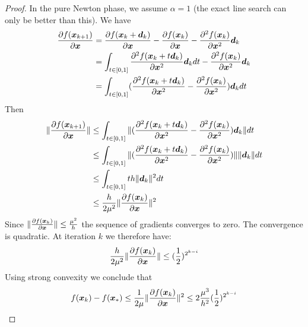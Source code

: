 \begin{proof}
   In the pure Newton phase, we assume $\alpha=1$ (the exact line search can
   only be better than this).
   We have
   \begin{align}
     \partialfrac{\xb}{f(\xb_{k+1})} &= \partialfrac{\xb}{f(\xb_{k} + \db_k)} -\partialfrac{\xb}{f(\xb_k)} -  \partialfrac{\xb^2}{^2 f(\xb_k)} \db_k \\
                                     &= \int_{t \in [0, 1]} \partialfrac{\xb^2}{^2 f(\xb_{k} + t \db_k)} \db_k dt  -  \partialfrac{\xb^2}{^2 f(\xb_k)} \db_k \\
                                     &=\int_{t \in [0, 1]} (\partialfrac{\xb^2}{^2 f(\xb_{k} + t \db_k)} -  \partialfrac{\xb^2}{^2 f(\xb_k)}) \db_k dt  \\
   \end{align}
   Then 
   \begin{align}
     \|\partialfrac{\xb}{f(\xb_{k+1})}\| &\leq \int_{t \in [0, 1]} \|(\partialfrac{\xb^2}{^2 f(\xb_{k} + t \db_k)} -  \partialfrac{\xb^2}{^2 f(\xb_k)}) \db_k\| dt  \\
     &\leq \int_{t \in [0, 1]} \|(\partialfrac{\xb^2}{^2 f(\xb_{k} + t \db_k)} -  \partialfrac{\xb^2}{^2 f(\xb_k)})\| \| \db_k\| dt  \\
                                         &\leq  \int_{t \in [0, 1]} t h\|\db_k\|^2 dt  \\
                                         &\leq  \frac{h}{2 \mu^2}\|\partialfrac{\xb}{f(\xb_{k})}\|^2 \\
   \end{align}
   Since $\|\partialfrac{\xb}{f(\xb_{k})}\| \leq \frac{\mu^2}{h}$ the sequence
   of gradients converges to zero. The convergence is quadratic.
   At iteration $k$ we therefore have:
   \begin{align}
   \frac{h}{2 \mu^2} \|\partialfrac{\xb}{f(\xb_{k})}\|
     &\leq  (\frac12)^{2^{k-i}} \\
   \end{align}
   Using strong convexity we conclude that
   \begin{align}
     f(\xb_k) - f(\xb_*) \leq \frac1{2 \mu} \|\partialfrac{\xb}{f(\xb_{k})}\|^2 \leq  2 \frac{\mu^3}{h^2} (\frac12)^{2^{k-i}}
   \end{align}
 \end{proof}

